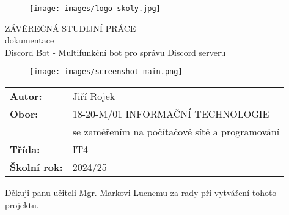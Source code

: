 \documentclass[12pt, a4paper]{report}
\title{\nazevPrace} %
\author{\jmenoAutora} %
\date{\datumOdevzdani} %
\newcommand\obor{INFORMAČNÍ TECHNOLOGIE} %
\newcommand\kodOboru{18-20-M/01} %
\newcommand\zamereni{se zaměřením na počítačové sítě a programování} %
\newcommand\trida{IT4} %
\newcommand\jmenoAutora{Jiří Rojek}  %
\newcommand\skolniRok{2024/25} %
\newcommand\nazevPrace{Discord Bot - Multifunkční bot pro správu Discord serveru} %
\begin{document}
	
	\pagestyle{empty}
	
	\cleardoublepage

	
	{\selectfont
		\begin{figure}[h]
			\centering
			\texttt{[image: images/logo-skoly.jpg]}
		\end{figure}
		
		
		{\bfseries %
			\begin{center}
				\vspace{0.025 \textheight}
				\LARGE{ZÁVĚREČNÁ STUDIJNÍ PRÁCE}\\
				\large{dokumentace}\\
				\vspace{0.075 \textheight}
				\LARGE {\nazevPrace}\\
			\end{center}  
		}%
		
		\begin{figure}[h]
			\centering
			\texttt{[image: images/screenshot-main.png]}
			\label{fig:main-screen}
		\end{figure}
		
		\vspace{0.02 \textheight}
		\begin{table}[h!]
			\begin{tabular}{ll}
				\textbf{Autor:} & \jmenoAutora\\ 
				\textbf{Obor:} & \kodOboru { } \obor\\
				\textbf{} & \zamereni\\
				\textbf{Třída:} & \trida\\
				\textbf{Školní rok:} & \skolniRok\\
			\end{tabular}
			
		\end{table}		
	}
	
	\clearpage


	
	\noindent Děkuji panu učiteli Mgr. Markovi Lucnemu za rady při vytváření tohoto projektu.
	
\end{document}
